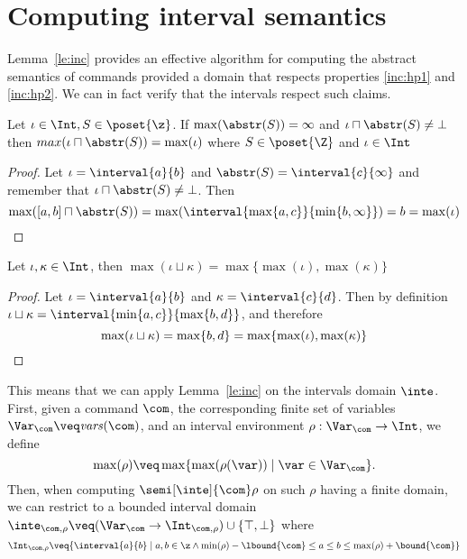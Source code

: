 \section{Computing interval semantics}
\label{sec:computingint}

Lemma~\ref{le:inc} provides an effective algorithm for computing the
abstract semantics of commands provided a domain that respects
properties \ref{inc:hp1} and \ref{inc:hp2}. We can in fact verify that
the intervals respect such claims.

\begin{observation}
  Let \(\iota \in \Int, S \in \poset{\z}\). If
  \(\max(\abstr(S)) = \infty\) and
  \({\iota \sqcap \abstr(S) \neq \bot}\) then
  \({max(\iota \sqcap \abstr(S)) = \max(\iota)}\) where
  \(S \in \poset{\Z}\) and \(\iota \in \Int\)
\end{observation}

\begin{proof}
  Let \(\iota = \interval{a}{b}\) and
  \(\abstr(S) = \interval{c}{\infty}\) and remember that
  \({\iota \sqcap \abstr(S) \neq \bot}\). Then
  \begin{equation*}
    \max([a,b] \sqcap \abstr(S)) = \max(\interval{\max\{a, c\}}{\min\{b , \infty\}}) = b = \max(\iota) \qedhere
  \end{equation*}
\end{proof}

\begin{observation}
  Let \(\iota, \kappa \in \Int\), then
  \(\max(\iota \sqcup \kappa) = \max\{\max(\iota), \max(\kappa)\}\)
\end{observation}

\begin{proof}
  Let \(\iota = \interval{a}{b}\) and \(\kappa =
  \interval{c}{d}\). Then by definition
  \(\iota \sqcup \kappa = \interval{\min\{a,c\}}{\max\{b,d\}}\), and
  therefore
  \begin{equation*}
    \max(\iota \sqcup \kappa) = \max\{b,d\} = \max\{\max(\iota), \max(\kappa)\} \qedhere
  \end{equation*}
\end{proof}

This means that we can apply Lemma~\ref{le:inc} on the intervals
domain \(\inte\).  First, given a command \(\com\), the corresponding
finite set of variables \(\Var_{\com} \veq \mathit{vars}(\com)\), and
an interval environment \(\rho : \Var_{\com} \to \Int\), we define
\[\max(\rho) \veq \max \{ \max(\rho(\var)) \mid \var \in \Var_{\com}
  \}.\]
%
Then, when computing \(\semi[\inte]{\com} \rho\) on such \(\rho\)
having a finite domain, we can restrict to a bounded interval domain
\(\inte_{\com,\rho} \veq (\Var_{\com} \to \Int_{\com,\rho}) \cup
\{ \top, \bot \}\) where
\begin{equation*}
  \Int_{\com,\rho} \veq \{ \interval{a}{b} \mid a, b \in \z \land
  \min(\rho) - \lbound{\com} \leq a \leq b \leq \max(\rho) + \bound{\com}\}
\end{equation*}

